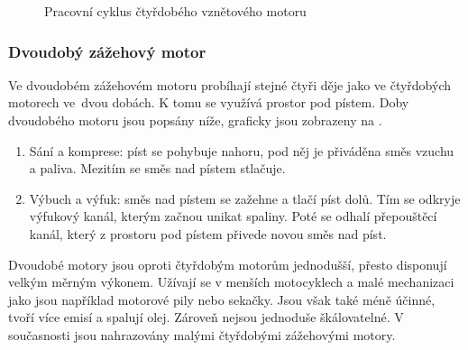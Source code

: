\begin{figure}[H]
    
    \caption{Pracovní cyklus čtyřdobého vznětového motoru \jaDiag}
    \label{obr:PracovniCyklusCtyrdobehoVznetovehoMotoru}
\end{figure}

\newpage

\subsubsection{Dvoudobý zážehový motor}
{Ve dvoudobém zážehovém motoru probíhají stejné čtyři děje jako ve čtyřdobých motorech ve~dvou dobách. K tomu se využívá prostor pod pístem. Doby dvoudobého motoru jsou popsány níže, graficky jsou zobrazeny na .}
\cite{VUTB:DvoudobyMotorProParagliding}
\begin{enumerate}
    \item {Sání a komprese: píst se pohybuje nahoru, pod něj je přiváděna směs vzuchu a paliva. Mezitím se směs nad pístem stlačuje.}
    \item {Výbuch a výfuk: směs nad pístem se zažehne a tlačí píst dolů. Tím se odkryje výfukový kanál, kterým začnou unikat spaliny. Poté se odhalí přepouštěcí kanál, který z prostoru pod pístem přivede novou směs nad píst.}
\end{enumerate}
{Dvoudobé motory jsou oproti čtyřdobým motorům jednodušší, přesto disponují velkým měrným výkonem. Užívají se v menších motocyklech a malé mechanizaci jako jsou například motorové pily nebo sekačky. Jsou však také méně účinné, tvoří více emisí a spalují olej. Zároveň nejsou jednoduše škálovatelné. V současnosti jsou nahrazovány malými čtyřdobými zážehovými motory.}
\cite{VUTB:DvoudobyMotorProParagliding}

